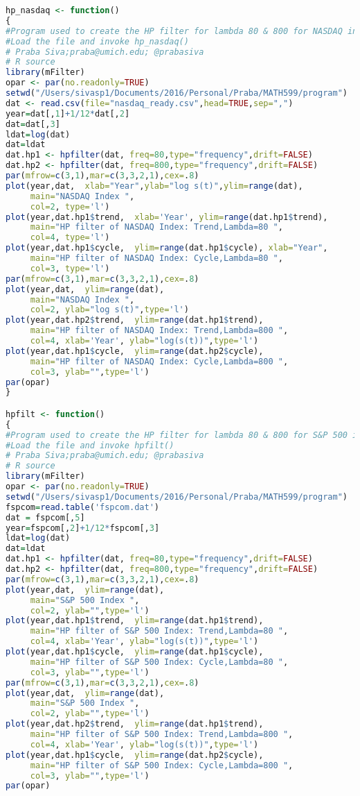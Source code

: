 \begin{lstlisting}[basicstyle=\tiny,language=R]
hp_nasdaq <- function()
{
#Program used to create the HP filter for lambda 80 & 800 for NASDAQ index
#Load the file and invoke hp_nasdaq()
# Praba Siva;praba@umich.edu; @prabasiva
# R source
library(mFilter)
opar <- par(no.readonly=TRUE)
setwd("/Users/sivasp1/Documents/2016/Personal/Praba/MATH599/program")
dat <- read.csv(file="nasdaq_ready.csv",head=TRUE,sep=",")
year=dat[,1]+1/12*dat[,2]
dat=dat[,3]
ldat=log(dat)
dat=ldat
dat.hp1 <- hpfilter(dat, freq=80,type="frequency",drift=FALSE)
dat.hp2 <- hpfilter(dat, freq=800,type="frequency",drift=FALSE)
par(mfrow=c(3,1),mar=c(3,3,2,1),cex=.8)
plot(year,dat,  xlab="Year",ylab="log s(t)",ylim=range(dat),
     main="NASDAQ Index ",
     col=2, type='l')
plot(year,dat.hp1$trend,  xlab='Year', ylim=range(dat.hp1$trend),
     main="HP filter of NASDAQ Index: Trend,Lambda=80 ",
     col=4, type='l')
plot(year,dat.hp1$cycle,  ylim=range(dat.hp1$cycle), xlab="Year", 
     main="HP filter of NASDAQ Index: Cycle,Lambda=80 ",
     col=3, type='l')
par(mfrow=c(3,1),mar=c(3,3,2,1),cex=.8)
plot(year,dat,  ylim=range(dat),
     main="NASDAQ Index ",
     col=2, ylab="log s(t)",type='l')
plot(year,dat.hp2$trend,  ylim=range(dat.hp1$trend),
     main="HP filter of NASDAQ Index: Trend,Lambda=800 ",
     col=4, xlab='Year', ylab="log(s(t))",type='l')
plot(year,dat.hp1$cycle,  ylim=range(dat.hp2$cycle),
     main="HP filter of NASDAQ Index: Cycle,Lambda=800 ",
     col=3, ylab="",type='l')
par(opar)
}

hpfilt <- function()
{
#Program used to create the HP filter for lambda 80 & 800 for S&P 500 index
#Load the file and invoke hpfilt()
# Praba Siva;praba@umich.edu; @prabasiva
# R source
library(mFilter)
opar <- par(no.readonly=TRUE)
setwd("/Users/sivasp1/Documents/2016/Personal/Praba/MATH599/program")
fspcom=read.table('fspcom.dat')
dat = fspcom[,5]
year=fspcom[,2]+1/12*fspcom[,3]
ldat=log(dat)
dat=ldat
dat.hp1 <- hpfilter(dat, freq=80,type="frequency",drift=FALSE)
dat.hp2 <- hpfilter(dat, freq=800,type="frequency",drift=FALSE)
par(mfrow=c(3,1),mar=c(3,3,2,1),cex=.8)
plot(year,dat,  ylim=range(dat),
     main="S&P 500 Index ",
     col=2, ylab="",type='l')
plot(year,dat.hp1$trend,  ylim=range(dat.hp1$trend),
     main="HP filter of S&P 500 Index: Trend,Lambda=80 ",
     col=4, xlab='Year', ylab="log(s(t))",type='l')
plot(year,dat.hp1$cycle,  ylim=range(dat.hp1$cycle),
     main="HP filter of S&P 500 Index: Cycle,Lambda=80 ",
     col=3, ylab="",type='l')
par(mfrow=c(3,1),mar=c(3,3,2,1),cex=.8)
plot(year,dat,  ylim=range(dat),
     main="S&P 500 Index ",
     col=2, ylab="",type='l')
plot(year,dat.hp2$trend,  ylim=range(dat.hp1$trend),
     main="HP filter of S&P 500 Index: Trend,Lambda=800 ",
     col=4, xlab='Year', ylab="log(s(t))",type='l')
plot(year,dat.hp1$cycle,  ylim=range(dat.hp2$cycle),
     main="HP filter of S&P 500 Index: Cycle,Lambda=800 ",
     col=3, ylab="",type='l')
par(opar)


\end{lstlisting}
